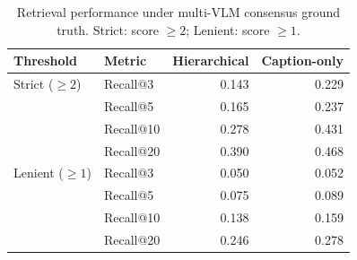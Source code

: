 \begin{table}[t]
\centering
\caption{Retrieval performance under multi-VLM consensus ground truth. Strict: score $\geq 2$; Lenient: score $\geq 1$.}
\label{tab:recall}
\small
\begin{tabular}{llrr}
\toprule
Threshold & Metric & Hierarchical & Caption-only \\
\midrule
Strict ($\geq 2$) & Recall@3 & 0.143 & 0.229 \\
 & Recall@5 & 0.165 & 0.237 \\
 & Recall@10 & 0.278 & 0.431 \\
 & Recall@20 & 0.390 & 0.468 \\
\midrule
Lenient ($\geq 1$) & Recall@3 & 0.050 & 0.052 \\
 & Recall@5 & 0.075 & 0.089 \\
 & Recall@10 & 0.138 & 0.159 \\
 & Recall@20 & 0.246 & 0.278 \\
\bottomrule
\end{tabular}
\end{table}
